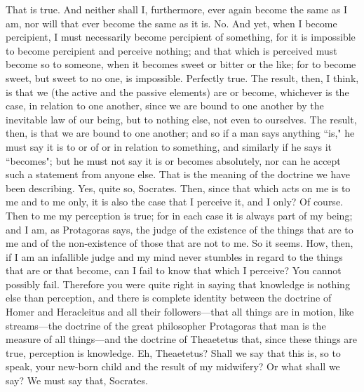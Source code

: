 \documentclass[letterpaper,12pt]{article}
\newcommand{\stephpag}[1]{\marginnote{\small\itshape\fontfamily{ppl}\selectfont #1}}
\begin{document}
\begin{drama}
\theaetetusspeaks
That is true.
\socratesspeaks
And neither shall I, furthermore, ever again become the same as I am, nor will that ever become the same as it is.
\theaetetusspeaks
No.
\socratesspeaks
And yet, when I become percipient, I must necessarily become percipient of something, for it is impossible to become percipient and perceive nothing; and that which is perceived must become so to someone, \stephpag{b} when it becomes sweet or bitter or the like; for to become sweet, but sweet to no one, is impossible.
\theaetetusspeaks
Perfectly true.
\socratesspeaks
The result, then, I think, is that we (the active and the passive elements) are or become, whichever is the case, in relation to one another, since we are bound to one another by the inevitable law of our being, but to nothing else, not even to ourselves. The result, then, is that we are bound to one another; and so if a man says anything ``is," he must say it is to or of or in relation to something, and similarly if he says it ``becomes"; but he must not say \stephpag{c} it is or becomes absolutely, nor can he accept such a statement from anyone else. That is the meaning of the doctrine we have been describing.
\theaetetusspeaks
Yes, quite so, Socrates.
\socratesspeaks
Then, since that which acts on me is to me and to me only, it is also the case that I perceive it, and I only?
\theaetetusspeaks
Of course.
\socratesspeaks
Then to me my perception is true; for in each case it is always part of my being; and I am, as Protagoras says, the judge of the existence of the things that are to me and of the non-existence of those that are not to me.
\theaetetusspeaks
So it seems. \stephpag{d}
\socratesspeaks
How, then, if I am an infallible judge and my mind never stumbles in regard to the things that are or that become, can I fail to know that which I perceive?
\theaetetusspeaks
You cannot possibly fail.
\socratesspeaks
Therefore you were quite right in saying that knowledge is nothing else than perception, and there is complete identity between the doctrine of Homer and Heracleitus and all their followers—that all things are in motion, like streams—the doctrine of the great philosopher Protagoras that man is the measure of all things—and the doctrine of Theaetetus that, \stephpag{e} since these things are true, perception is knowledge. Eh, Theaetetus? Shall we say that this is, so to speak, your new-born child and the result of my midwifery? Or what shall we say?
\theaetetusspeaks
We must say that, Socrates.
\socratesspeaks

\end{drama}
\end{document}
